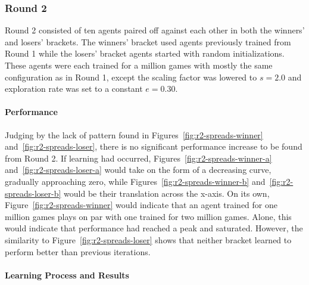 
\subsubsection*{Round 2}
\label{sec:findings-r2}

Round 2 consisted of ten agents paired off against each other
in both the winners' and losers' brackets.
%
The winners' bracket used agents previously trained from Round 1
while the losers' bracket agents started with random initializations.
%
These agents were each trained for a million games
with mostly the same configuration as in Round 1,
except the scaling factor was lowered to $s = 2.0$
and exploration rate was set to a constant $e = 0.30$.

\paragraph*{Performance}
\label{sec:findings-r2-perf}

Judging by the lack of pattern found in
Figures~\ref{fig:r2-spreads-winner}
and~\ref{fig:r2-spreads-loser},
there is no significant performance increase to be found from Round 2.
%
If learning had occurred,
Figures~\ref{fig:r2-spreads-winner-a}
and~\ref{fig:r2-spreads-loser-a}
would take on the form of a decreasing curve,
gradually approaching zero,
while Figures~\ref{fig:r2-spreads-winner-b}
and~\ref{fig:r2-spreads-loser-b}
would be their translation across the x-axis.
%
On its own, Figure~\ref{fig:r2-spreads-winner}
would indicate that an agent trained for one million games plays on par with
one trained for two million games.
%
Alone,
this would indicate that performance had reached a peak and saturated.
%
However,
the similarity to Figure~\ref{fig:r2-spreads-loser}
shows that neither bracket learned to perform better than previous iterations.





%



\paragraph*{Learning Process and Results}
\label{sec:findings-r2-results}


